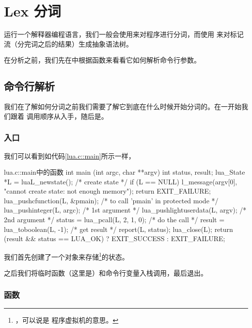 

\chapter{Lex 分词}

运行一个解释器编程语言，我们一般会使用来对程序进行分词，而使用%
来对标记流（分完词之后的结果）生成抽象语法树。

在分析之前，我们先在中根据函数来看看它如何解析命令行参数。

\section{命令行解析}

我们在了解如何分词之前我们需要了解它到底在什么时候开始分词的。在一开始我们跟着
调用顺序从入手，随后是。

\subsection{入口}

我们可以看到如代码\ref{lua.c::main}所示一样，

\begin{ccode}{lua.c::main}{中的函数}
int main (int argc, char **argv) {
  int status, result;
  lua_State *L = luaL_newstate();  /* create state */
  if (L == NULL) {
    l_message(argv[0], "cannot create state: not enough memory");
    return EXIT_FAILURE;
  }
  lua_pushcfunction(L, &pmain);  /* to call 'pmain' in protected mode */
  lua_pushinteger(L, argc);  /* 1st argument */
  lua_pushlightuserdata(L, argv); /* 2nd argument */
  status = lua_pcall(L, 2, 1, 0);  /* do the call */
  result = lua_toboolean(L, -1);  /* get result */
  report(L, status);
  lua_close(L);
  return (result && status == LUA_OK) ? EXIT_SUCCESS : EXIT_FAILURE;
}
\end{ccode}

我们首先创建了一个对象来存储\footnote{，可以说是
程序虚拟机的意思。}的状态。

之后我们将临时函数（这里是）和命令行变量入栈调用，最后退出。

\subsection{函数}


